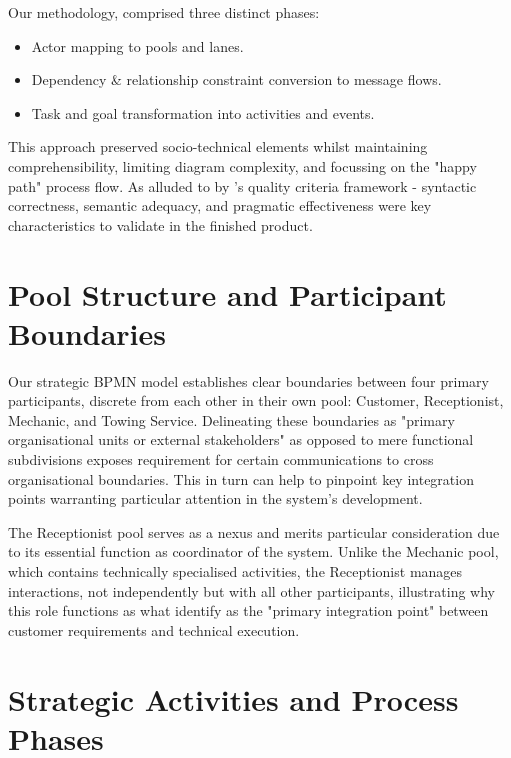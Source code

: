 \documentclass[14pt,a4paper]{article}
\begin{document}
\vspace{0.7em}
Our methodology, comprised three distinct phases:

\begin{itemize}
  \item Actor mapping to pools and lanes.
  \item Dependency \& relationship constraint conversion to message flows.
  \item Task and goal transformation into activities and events.
\end{itemize}

This approach preserved socio-technical elements whilst maintaining comprehensibility, limiting diagram complexity, and focussing on the "happy path" process flow. As alluded to by \textcite[p. 136]{Corradini2018}'s quality criteria framework - syntactic correctness, semantic adequacy, and pragmatic effectiveness were key characteristics to validate in the finished product.

\section{Pool Structure and Participant Boundaries}

Our strategic BPMN model establishes clear boundaries between four primary participants, discrete from each other in their own pool: Customer, Receptionist, Mechanic, and Towing Service. Delineating these boundaries as "primary organisational units or external stakeholders" \textcite[p. 103]{Kluza2017} as opposed to mere functional subdivisions exposes requirement for certain communications to cross organisational boundaries. This in turn can help to pinpoint key integration points warranting particular attention in the system's development.

The Receptionist pool serves as a nexus and merits particular consideration due to its essential function as coordinator of the system. Unlike the Mechanic pool, which contains technically specialised activities, the Receptionist manages interactions, not independently but with all other participants, illustrating why this role functions as what \textcite[p. 48]{Gorton2017} identify as the "primary integration point" between customer requirements and technical execution.

\section{Strategic Activities and Process Phases}
\end{document}
